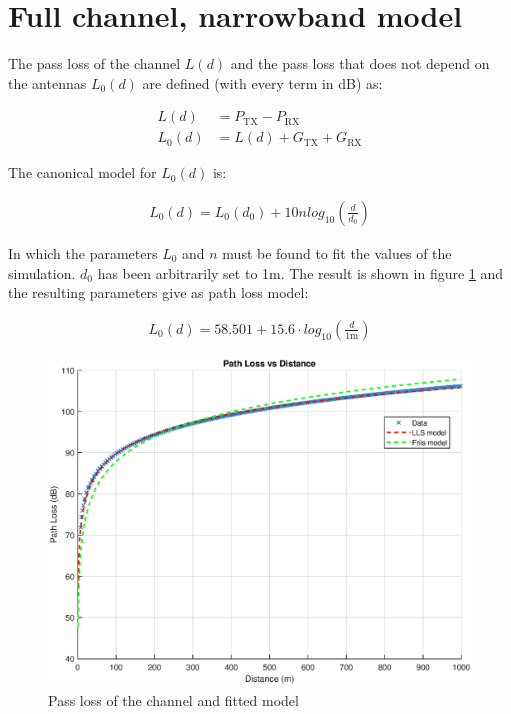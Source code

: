 \documentclass[10pt,a4paper]{ULBreport}
\begin{document}
\section{Full channel, narrowband model}

The pass loss of the channel $L(d)$ and the pass loss that does not depend on the antennas $L_0(d)$ are defined (with every term in dB) as:


\begin{subequations}
    \label{eq:pass_loss}
    \begin{align}
        L(d) &= P_{\text{TX}} - P_{\text{RX}}\\
        L_0(d) &= L(d) + G_{\text{TX}} + G_{\text{RX}}
    \end{align}
\end{subequations}

The canonical model for $L_0(d)$ is:

\begin{align*}
    L_0(d) = L_0(d_0) + 10 n log_{10} \left(\frac{d}{d_0}\right)
\end{align*}

In which the parameters $L_0$ and $n$ must be found to fit the values of the simulation. $d_0$ has been arbitrarily set to 1m. The result is shown in figure \ref{fig:pass_loss} and the resulting parameters give as path loss model:

\begin{align}
    \label{eq:pass_loss_model}
    L_0(d) = 58.501 + 15.6 \cdot log_{10} \left(\frac{d}{1\text{m}}\right)
\end{align}

\begin{figure}[H]
    \centering
    \includegraphics[width=1\textwidth]{3_5_model.eps}
    \caption{Pass loss of the channel and fitted model}
    \label{fig:pass_loss}
\end{figure}
\end{document}
